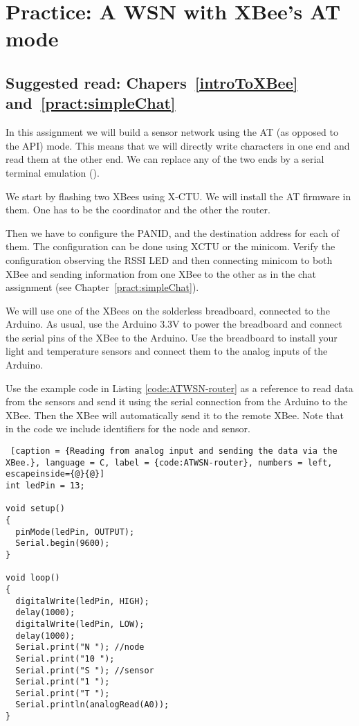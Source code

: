 \chapter{Practice: A WSN with XBee's AT mode}\label{ATSensorNetwork}
\section*{Suggested read: Chapers~\ref{introToXBee} and~\ref{pract:simpleChat}}

In this assignment we will build a sensor network using the AT (as opposed to the API) mode.
This means that we will directly write characters in one end and read them at the other end.
We can replace any of the two ends by a serial terminal emulation (\emph{}).

We start by flashing two XBees using X-CTU.
We will install the AT firmware in them.
One has to be the coordinator and the other the router.

Then we have to configure the PANID, and the destination address for each of them.
The configuration can be done using XCTU or the minicom.
Verify the configuration observing the RSSI LED and then connecting minicom to both XBee and sending information from one XBee to the other as in the chat assignment (see Chapter~\ref{pract:simpleChat}).

We will use one of the XBees on the solderless breadboard, connected to the Arduino.
As usual, use the Arduino 3.3V to power the breadboard and connect the serial pins of the XBee to the Arduino.
Use the breadboard to install your light and temperature sensors and connect them to the analog inputs of the Arduino.

Use the example code in Listing \ref{code:ATWSN-router} as a reference to read data from the sensors and send it using the serial connection from the Arduino to the XBee. 
Then the XBee will automatically send it to the remote XBee.
Note that in the code we include identifiers for the node and sensor.

\begin{lstlisting} [caption = {Reading from analog input and sending the data via the XBee.}, language = C, label = {code:ATWSN-router}, numbers = left, escapeinside={@}{@}]
int ledPin = 13;

void setup()
{
  pinMode(ledPin, OUTPUT);
  Serial.begin(9600);
}

void loop()
{
  digitalWrite(ledPin, HIGH);
  delay(1000);
  digitalWrite(ledPin, LOW);
  delay(1000);
  Serial.print("N "); //node
  Serial.print("10 ");
  Serial.print("S "); //sensor
  Serial.print("1 ");
  Serial.print("T ");
  Serial.println(analogRead(A0));
}
\end{lstlisting}


